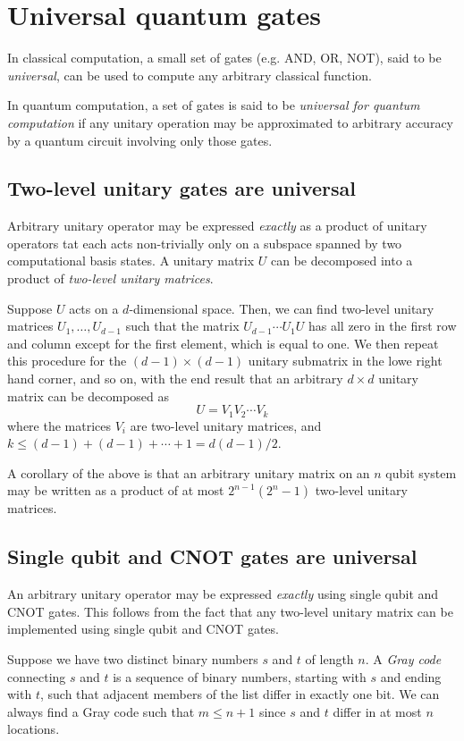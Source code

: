 \section{Universal quantum gates}
In classical computation,
a small set of gates (e.g. AND, OR, NOT),
said to be \emph{universal},
can be used to compute any arbitrary classical function.

In quantum computation,
a set of gates is said to be \emph{universal for quantum computation} if any unitary operation may be approximated to arbitrary accuracy by a quantum circuit involving only those gates.

\subsection{Two-level unitary gates are universal}
Arbitrary unitary operator may be expressed \emph{exactly} as a product of unitary operators tat each acts non-trivially only on a subspace spanned by two computational basis states.
A unitary matrix $U$ can be decomposed into a product of \emph{two-level unitary matrices}.

Suppose $U$ acts on a $d$-dimensional space.
Then,
we can find two-level unitary matrices $U_1, \ldots, U_{d-1}$ such that the matrix $U_{d-1}\cdots U_1 U$ has all zero in the first row and column except for the first element,
which is equal to one.
We then repeat this procedure for the $(d-1) \times (d-1)$ unitary submatrix in the lowe right hand corner,
and so on,
with the end result that an arbitrary $d \times d$ unitary matrix can be decomposed as
\[
    U = V_1 V_2 \cdots V_k
\]
where the matrices $V_i$ are two-level unitary matrices,
and $k \le (d-1) + (d-1) + \cdots + 1 = d(d-1)/2$.

A corollary of the above is that an arbitrary unitary matrix on an $n$ qubit system may be written as a product of at most $2^{n-1}(2^n-1)$ two-level unitary matrices.

\subsection{Single qubit and CNOT gates are universal}
An arbitrary unitary operator may be expressed \emph{exactly} using single qubit and CNOT gates.
This follows from the fact that any two-level unitary matrix can be implemented using single qubit and CNOT gates.

Suppose we have two distinct binary numbers $s$ and $t$ of length $n$.
A \emph{Gray code} connecting $s$ and $t$ is a sequence of binary numbers,
starting with $s$ and ending with $t$,
such that adjacent members of the list differ in exactly one bit.
We can always find a Gray code such that $m \le n + 1$ since $s$ and $t$ differ in at most $n$ locations.

